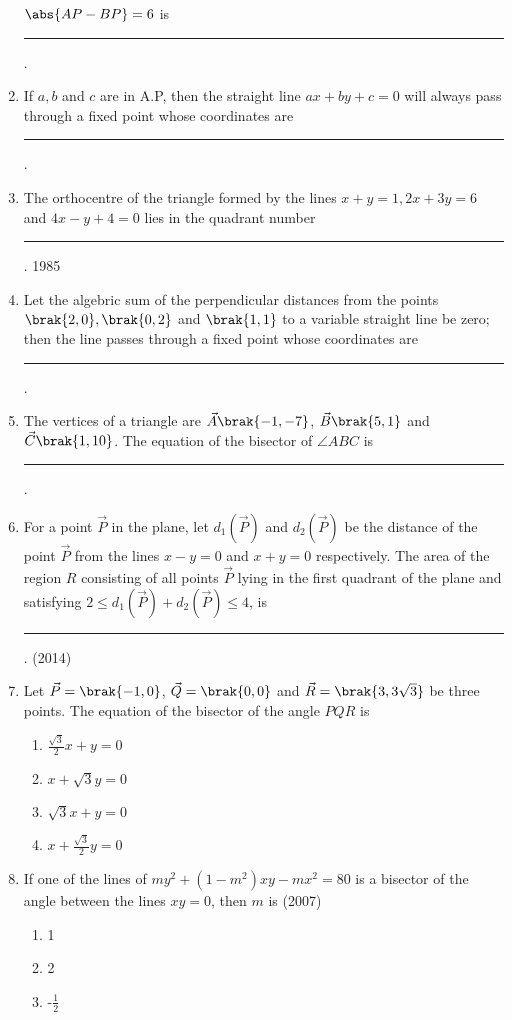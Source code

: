 \begin{enumerate}
    $\abs{AP-BP}=6$ is \rule{1cm}{0.01pt}.
    \hfill{}
    \item If $a,b$ and $c$ are in A.P, then the straight line $ax +by +c=0$ will always pass through a fixed point whose coordinates are \rule{1cm}{0.01pt}.
    \hfill{}
    \item The orthocentre of the triangle formed by the lines $x+y=1, 2x +3y=6$ and $4x-y+4=0$ lies in the quadrant number \rule{1cm}{0.01pt}.
    \hfill{1985}
    \item Let the algebric sum of the perpendicular distances from the points $\brak{2,0},\brak{0,2}$ and $\brak{1,1}$ to a variable straight line be zero; then the line passes through a fixed point whose coordinates are \rule{1cm}{0.01pt}.
    \hfill{}
    \item The vertices of a triangle are $\vec{A}\brak{-1,-7}$, $\vec{B}\brak{5,1}$ and $\vec{C}\brak{1,10}$. The equation of the bisector of $\angle{ABC}$ is \rule{1cm}{0.01pt}.
    \hfill{}
	\item For a point $\vec{P}$ in the plane, let $d_{1}(\vec{P})$ and $d_{2}(\vec{P})$ be the 
		distance of the point $\vec{P}$ from the lines $x-y=0$ and $x+y =0$ 
respectively. The area of the region $R$ consisting of all points 
		$\vec{P}$ lying in the first quadrant of the plane and satisfying
$2\leq d_{1}(\vec{P})+d_{2}(\vec{P}) \leq4$, is \rule{1cm}{0.01pt}.
		\hfill{(2014)}
	\item Let $\vec{P}=\brak{-1, 0}$, $\vec{Q}=\brak{0, 0}$ and $\vec{R}=\brak{3, 3\sqrt{3}}$ be three points. The equation of the bisector of the angle $PQR$ is \hfill{}
\begin{multicols}{4}
\begin{enumerate}
\item $\frac{\sqrt{3}}{2}x+y=0$
\item $x+\sqrt{3}y=0$
\item $\sqrt{3}x+y=0$
\item $x+\frac{\sqrt{3}}{2}y=0$
\end{enumerate}
\end{multicols}
\item If one of the lines of $my^{2}+(1-m^{2})xy-mx^{2}=80$ is a bisector 
of the angle between the lines $xy=0$, then $m$ is
\hfill{(2007)}
\begin{multicols}{4}
\begin{enumerate}
\item 1
\item 2
\item -$\frac{1}{2}$

\end{enumerate}
\end{multicols}
\end{enumerate}
